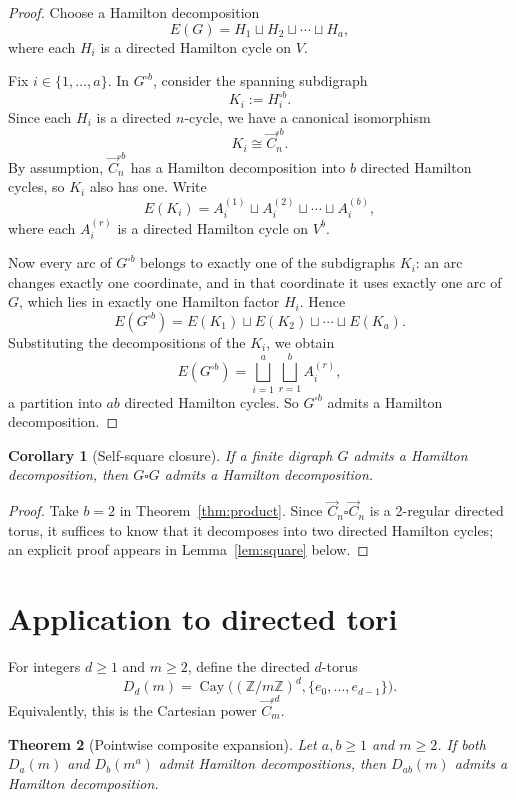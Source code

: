 \documentclass[11pt]{article}
\newtheorem{theorem}{Theorem}
\newtheorem{corollary}[theorem]{Corollary}
\theoremstyle{remark}
\newcommand{\Cay}{\operatorname{Cay}}
\newcommand{\torus}[2]{D_{#1}(#2)}
\begin{document}
\begin{proof}
Choose a Hamilton decomposition
\[
E(G)=H_1\sqcup H_2\sqcup\cdots\sqcup H_a,
\]
where each $H_i$ is a directed Hamilton cycle on $V$.

Fix $i\in\{1,\dots,a\}$.
In $G^{\square b}$, consider the spanning subdigraph
\[
K_i:=H_i^{\square b}.
\]
Since each $H_i$ is a directed $n$-cycle, we have a canonical isomorphism
\[
K_i\cong \vec C_n^{\square b}.
\]
By assumption, $\vec C_n^{\square b}$ has a Hamilton decomposition into $b$ directed Hamilton cycles, so $K_i$ also has one.
Write
\[
E(K_i)=A_i^{(1)}\sqcup A_i^{(2)}\sqcup\cdots\sqcup A_i^{(b)},
\]
where each $A_i^{(r)}$ is a directed Hamilton cycle on $V^b$.

Now every arc of $G^{\square b}$ belongs to exactly one of the subdigraphs $K_i$:
an arc changes exactly one coordinate, and in that coordinate it uses exactly one arc of $G$, which lies in exactly one Hamilton factor $H_i$.
Hence
\[
E(G^{\square b})=E(K_1)\sqcup E(K_2)\sqcup\cdots\sqcup E(K_a).
\]
Substituting the decompositions of the $K_i$, we obtain
\[
E(G^{\square b})=\bigsqcup_{i=1}^a\bigsqcup_{r=1}^b A_i^{(r)},
\]
a partition into $ab$ directed Hamilton cycles.
So $G^{\square b}$ admits a Hamilton decomposition.
\end{proof}

\begin{corollary}[Self-square closure]\label{cor:selfsquare}
If a finite digraph $G$ admits a Hamilton decomposition, then $G\square G$ admits a Hamilton decomposition.
\end{corollary}

\begin{proof}
Take $b=2$ in Theorem~\ref{thm:product}.
Since $\vec C_n\square\vec C_n$ is a 2-regular directed torus, it suffices to know that it decomposes into two directed Hamilton cycles; an explicit proof appears in Lemma~\ref{lem:square} below.
\end{proof}

\section{Application to directed tori}

For integers $d\ge 1$ and $m\ge 2$, define the directed $d$-torus
\[
\torus{d}{m}=\Cay\bigl((\mathbb Z/m\mathbb Z)^d,\{e_0,\dots,e_{d-1}\}\bigr).
\]
Equivalently, this is the Cartesian power $\vec C_m^{\square d}$.

\begin{theorem}[Pointwise composite expansion]\label{thm:abm}
Let $a,b\ge 1$ and $m\ge 2$.
If both $\torus{a}{m}$ and $\torus{b}{m^a}$ admit Hamilton decompositions, then $\torus{ab}{m}$ admits a Hamilton decomposition.
\end{theorem}
\end{document}
